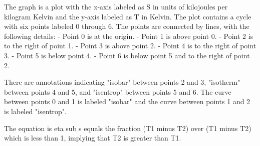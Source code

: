 The graph is a plot with the x-axis labeled as S in units of kilojoules per kilogram Kelvin and the y-axis labeled as T in Kelvin. The plot contains a cycle with six points labeled 0 through 6. The points are connected by lines, with the following details:
- Point 0 is at the origin.
- Point 1 is above point 0.
- Point 2 is to the right of point 1.
- Point 3 is above point 2.
- Point 4 is to the right of point 3.
- Point 5 is below point 4.
- Point 6 is below point 5 and to the right of point 2.

There are annotations indicating "isobar" between points 2 and 3, "isotherm" between points 4 and 5, and "isentrop" between points 5 and 6. The curve between points 0 and 1 is labeled "isobar" and the curve between points 1 and 2 is labeled "isentrop".

The equation is eta sub s equals the fraction (T1 minus T2) over (T1 minus T2) which is less than 1, implying that T2 is greater than T1.